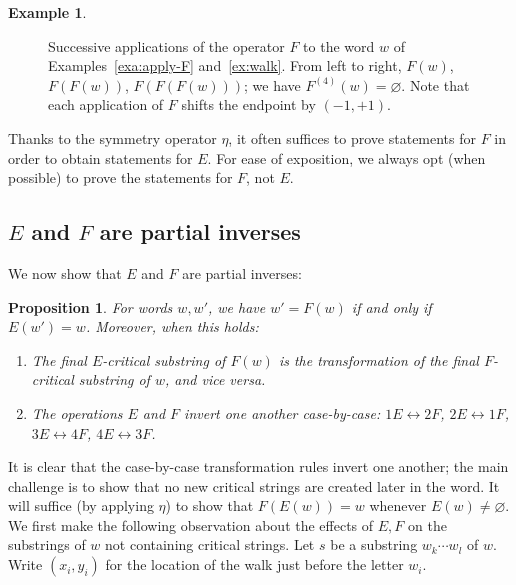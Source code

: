 \documentclass[10pt]{amsart}
\newtheorem{prop}[theorem]{Proposition}
\theoremstyle{definition}
\newtheorem{exam}[theorem]{Example}
\begin{document}
\begin{exam}
\begin{figure}[htb]
\caption{\label{fig:F-on-walks} Successive applications of the operator $F$ to the word 
$w$ of Examples~\ref{exa:apply-F} and~\ref{ex:walk}. From left to right, $F(w)$, $F(F(w))$, $F(F(F(w)))$; we have $F^{(4)}(w) = \varnothing$. Note that each application of $F$ shifts the endpoint by $(-1,+1)$.}
\end{figure}
\end{exam}




Thanks to the symmetry operator $\eta$, it often suffices to prove statements for $F$ in order to obtain statements for $E$. For ease of exposition, we always opt (when possible) to prove the statements for $F$, not $E$.

\subsection{\texorpdfstring{$E$}{E} and \texorpdfstring{$F$}{F} are partial inverses}

We now show that $E$ and $F$ are partial inverses:
\begin{prop}\label{prop:inverses}
For words $w,w'$, we have $w' = F(w)$ if and only if $E(w') = w$. Moreover, when this holds:
\begin{enumerate}[label={(\roman*)}]
\item %
The final $E$-critical substring of $F(w)$ is the transformation of the final $F$-critical substring of $w$, and vice versa.
\item %
The operations $E$ and $F$ invert one another case-by-case: $1E \leftrightarrow 2F$, $2E \leftrightarrow 1F$, $3E \leftrightarrow 4F$, $4E \leftrightarrow 3F$.
\end{enumerate}
\end{prop}

It is clear that the case-by-case transformation rules invert one another; the main challenge is to show that no new critical strings are created later in the word. It will suffice (by applying $\eta$) to show that $F(E(w)) = w$ whenever $E(w) \ne \varnothing$. We first make the following observation about the effects of $E,F$ on the substrings of $w$ not containing critical strings. Let $s$ be a substring $w_k \cdots w_l$ of $w$. Write $(x_i,y_i)$ for the location of the walk just before the letter $w_i$.
\end{document}
